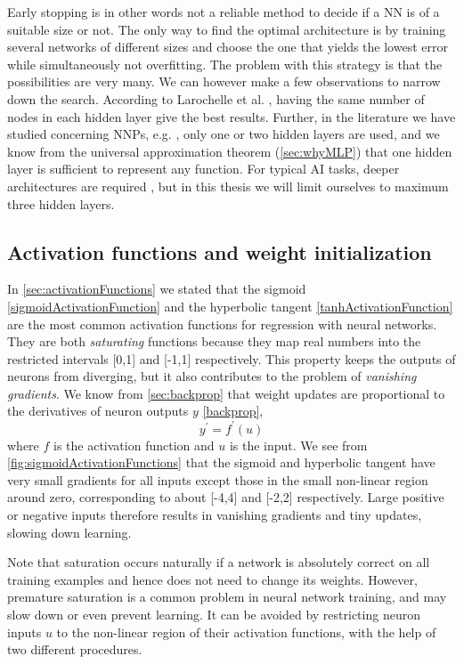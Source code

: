 \documentclass[twoside,english]{uiofysmaster}
\begin{document}
Early stopping is in other words not a reliable method to decide if a NN is of a suitable size or not. 
The only way to find the optimal architecture is by training several networks of different sizes and choose the one that yields
the lowest error while simultaneously not overfitting. The problem with this strategy is that the possibilities are very many. 
We can however make a few observations to narrow down the search. 
According to Larochelle et al. \cite{Larochelle09}, having the same number of nodes in each hidden layer give the best results. 
Further, in the literature we have studied concerning NNPs, e.g. \cite{Behler07} \cite{Raff05} \cite{Witkoskie05}, 
only one or two hidden layers are used, and we know from the universal approximation theorem (\autoref{sec:whyMLP})
that one hidden layer is sufficient to represent any function. For typical AI tasks, deeper architectures are required 
\cite{Bengio07}, but in this thesis we will limit ourselves to maximum three hidden layers. 


\subsection{Activation functions and weight initialization} \label{sec:hyperParamsActFunctions}
In \autoref{sec:activationFunctions} we stated that the sigmoid \eqref{sigmoidActivationFunction} and 
the hyperbolic tangent \eqref{tanhActivationFunction} are the most common activation functions for regression
with neural networks. They are both \textit{saturating} functions because they map real numbers into the restricted intervals 
[0,1] and [-1,1] respectively. This property keeps the outputs of neurons from diverging, but it also contributes to 
the problem of \textit{vanishing gradients}. We know from \autoref{sec:backprop} that
weight updates are proportional to the derivatives of neuron outputs $y$ \eqref{backprop},
\begin{equation}
 y^\prime = f^\prime(u)
\end{equation}
where $f$ is the activation function and $u$ is the input. 
We see from \autoref{fig:sigmoidActivationFunctions} that the sigmoid and hyperbolic
tangent have very small gradients for all inputs except those in the small non-linear region around zero, corresponding 
to about [-4,4] and [-2,2] respectively. 
Large positive or negative inputs therefore results in vanishing gradients and tiny updates, slowing down learning.

Note that saturation occurs naturally if a network is absolutely correct on all training examples and 
hence does not need to change its weights. However, premature saturation is a common problem in neural network training, and may slow
down or even prevent learning. It can be avoided by restricting neuron inputs $u$ to the non-linear region of their 
activation functions, with the help of two different procedures. 
\end{document}
